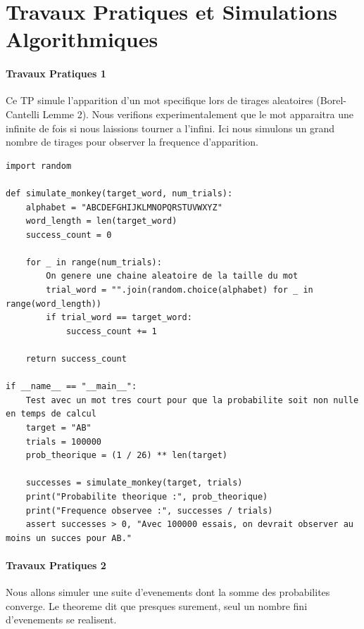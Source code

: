\documentclass[11pt,a4paper]{article}
\begin{document}
\newpage
\part{Travaux Pratiques et Simulations Algorithmiques}

\subsection*{Travaux Pratiques 1}
Ce TP simule l'apparition d'un mot specifique lors de tirages aleatoires (Borel-Cantelli Lemme 2).
Nous verifions experimentalement que le mot apparaitra une infinite de fois si nous laissions tourner a l'infini.
Ici nous simulons un grand nombre de tirages pour observer la frequence d'apparition.

\begin{lstlisting}
import random

def simulate_monkey(target_word, num_trials):
    alphabet = "ABCDEFGHIJKLMNOPQRSTUVWXYZ"
    word_length = len(target_word)
    success_count = 0

    for _ in range(num_trials):
        On genere une chaine aleatoire de la taille du mot
        trial_word = "".join(random.choice(alphabet) for _ in range(word_length))
        if trial_word == target_word:
            success_count += 1

    return success_count

if __name__ == "__main__":
    Test avec un mot tres court pour que la probabilite soit non nulle en temps de calcul
    target = "AB"
    trials = 100000
    prob_theorique = (1 / 26) ** len(target)

    successes = simulate_monkey(target, trials)
    print("Probabilite theorique :", prob_theorique)
    print("Frequence observee :", successes / trials)
    assert successes > 0, "Avec 100000 essais, on devrait observer au moins un succes pour AB."
\end{lstlisting}


\subsection*{Travaux Pratiques 2}
Nous allons simuler une suite d'evenements dont la somme des probabilites converge.
Le theoreme dit que presques surement, seul un nombre fini d'evenements se realisent.
\end{document}
